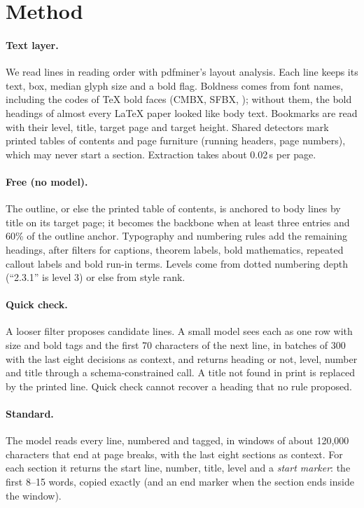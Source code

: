 \documentclass[10pt,twocolumn,letterpaper]{article}
\begin{document}
\section{Method}
\label{sec:method}

\paragraph{Text layer.} We read lines in reading order with pdfminer's layout analysis. Each line
keeps its text, box, median glyph size and a bold flag. Boldness comes from font names, including
the codes of \TeX{} bold faces (CMBX, SFBX, \etc); without them, the bold headings of almost every
\LaTeX{} paper looked like body text. Bookmarks are read with their level, title, target page and
target height. Shared detectors mark printed tables of contents and page furniture (running headers,
page numbers), which may never start a section. Extraction takes about 0.02\,s per page.

\paragraph{Free (no model).} The outline, or else the printed table of contents, is anchored to body
lines by title on its target page; it becomes the backbone when at least three entries and 60\% of
the outline anchor. Typography and numbering rules add the remaining headings, after filters for
captions, theorem labels, bold mathematics, repeated callout labels and bold run-in terms. Levels come
from dotted numbering depth (``2.3.1'' is level 3) or else from style rank.

\paragraph{Quick check.} A looser filter proposes candidate lines. A small model sees each as one
row with size and bold tags and the first 70 characters of the next line, in batches of 300 with the
last eight decisions as context, and returns heading or not, level, number and title through a
schema-constrained call. A title not found in print is replaced by the printed line. Quick check
cannot recover a heading that no rule proposed.

\paragraph{Standard.} The model reads every line, numbered and tagged, in windows of about 120,000
characters that end at page breaks, with the last eight sections as context. For each section it
returns the start line, number, title, level and a \emph{start marker}: the first 8--15 words,
copied exactly (and an end marker when the section ends inside the window).
\end{document}
